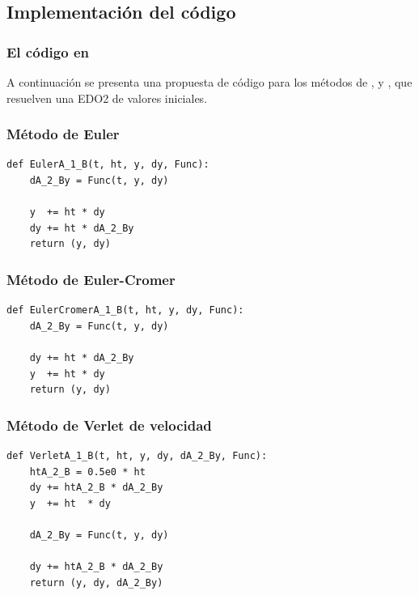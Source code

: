 \subsection*{Implementación del código}
\begin{frame}
\frametitle{El código en \python}
A continuación se presenta una propuesta de código para los métodos de ,  y , que resuelven una EDO2 de valores iniciales.
\end{frame}
\begin{frame}[fragile]
\frametitle{Método de Euler}
\begin{lstlisting}[caption=Método de Euler para EDO2, style=codigopython]
def EulerA_1_B(t, ht, y, dy, Func):
    dA_2_By = Func(t, y, dy)

    y  += ht * dy
    dy += ht * dA_2_By
    return (y, dy)
\end{lstlisting}
\end{frame}
\begin{frame}[fragile]
\frametitle{Método de Euler-Cromer}
\begin{lstlisting}[caption=Método de Euler-Cromer para EDO2, style=codigopython]
def EulerCromerA_1_B(t, ht, y, dy, Func):
    dA_2_By = Func(t, y, dy)

    dy += ht * dA_2_By
    y  += ht * dy
    return (y, dy)
\end{lstlisting}
\end{frame}
\begin{frame}
\frametitle{Método de Verlet de velocidad}
\begin{lstlisting}[caption=Método de Verlet de velocidad para EDO2, style=codigopython]
def VerletA_1_B(t, ht, y, dy, dA_2_By, Func):
    htA_2_B = 0.5e0 * ht
    dy += htA_2_B * dA_2_By
    y  += ht  * dy

    dA_2_By = Func(t, y, dy)

    dy += htA_2_B * dA_2_By
    return (y, dy, dA_2_By)
\end{lstlisting}
\end{frame}

